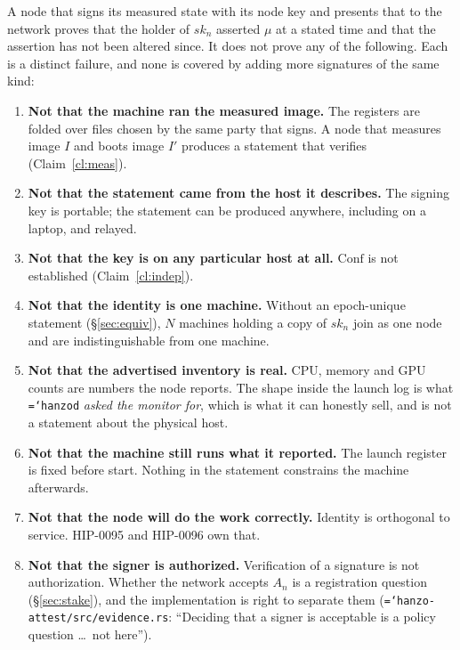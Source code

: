 \documentclass[11pt,a4paper]{article}
\newcommand{\code}[1]{\texttt{\hyphenchar\font=`\-\relax #1}}
\newcommand{\Conf}{\mathrm{Conf}}
\begin{document}
A node that signs its measured state with its node key and presents that to the
network proves that the holder of $sk_n$ asserted $\mu$ at a stated time and that
the assertion has not been altered since. It does not prove any of the following.
Each is a distinct failure, and none is covered by adding more signatures of the
same kind:

\begin{enumerate}[label=\textbf{N\arabic*.},leftmargin=2.6em]
\item \textbf{Not that the machine ran the measured image.} The registers are
  folded over files chosen by the same party that signs. A node that measures
  image $I$ and boots image $I'$ produces a statement that verifies
  (Claim~\ref{cl:meas}).
\item \textbf{Not that the statement came from the host it describes.} The
  signing key is portable; the statement can be produced anywhere, including on a
  laptop, and relayed.
\item \textbf{Not that the key is on any particular host at all.} $\Conf$ is not
  established (Claim~\ref{cl:indep}).
\item \textbf{Not that the identity is one machine.} Without an epoch-unique
  statement (\S\ref{sec:equiv}), $N$ machines holding a copy of $sk_n$ join as one
  node and are indistinguishable from one machine.
\item \textbf{Not that the advertised inventory is real.} CPU, memory and GPU
  counts are numbers the node reports. The shape inside the launch log is what
  \code{hanzod} \emph{asked the monitor for}, which is what it can honestly sell,
  and is not a statement about the physical host.
\item \textbf{Not that the machine still runs what it reported.} The launch
  register is fixed before start. Nothing in the statement constrains the machine
  afterwards.
\item \textbf{Not that the node will do the work correctly.} Identity is
  orthogonal to service. HIP-0095 and HIP-0096 own that.
\item \textbf{Not that the signer is authorized.} Verification of a signature is
  not authorization. Whether the network accepts $A_n$ is a registration question
  (\S\ref{sec:stake}), and the implementation is right to separate them
  (\code{hanzo-attest/src/evidence.rs}: ``Deciding that a signer is acceptable is
  a policy question \dots\ not here'').
\end{enumerate}
\end{document}
